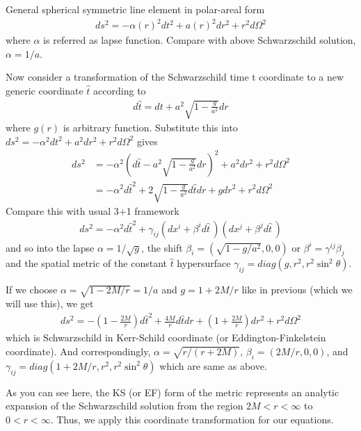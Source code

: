 \documentclass[prd]{revtex4}
\begin{document}
General spherical symmetric line element in polar-areal form
\begin{align}
\label{eqn:ss-met-pa}
ds^2 = - \alpha(r)^2 dt^2 + a(r)^2 dr^2 + r^2 d \Omega^2
\end{align}
where $\alpha$ is referred as lapse function. Compare with above Schwarzschild solution, $\alpha = 1/a$. 

Now consider a transformation of the Schwarzschild time t coordinate to a new generic coordinate $\hat{t}$ according to
\begin{align}
d\hat{t} = dt + a^2 \sqrt{1-\frac{g}{a^2}} dr
\end{align}
where $g(r)$ is arbitrary function. Substitute this into $ds^2 = -\alpha^2 dt^2 + a^2 dr^2 + r^2 d\Omega^2$ gives
\begin{align}
ds^2 &= - \alpha^2 \left (d\hat{t} - a^2 \sqrt{1-\frac{g}{a^2}} dr\right)^2 + a^2 dr^2 + r^2 d\Omega^2 \nonumber \\
&= - \alpha^2 d \hat{t}^2 + 2 \sqrt{1-\frac{g}{a^2}} d\hat{t} dr + g dr^2 + r^2 d \Omega^2
\end{align}
Compare this with usual 3+1 framework
\begin{align}
ds^2 = - \alpha^2 d \hat{t}^2 + \gamma_{ij} (dx^i + \beta^i d\hat{t}\,)(dx^j + \beta^j d\hat{t}\,)
\end{align}
and so into the lapse $\alpha = 1/\sqrt{g}$, the shift $\beta_i = (\sqrt{1-g/a^2},0,0)$ or $\beta^i = \gamma^{ij} \beta_j$ and the spatial metric of the constant $\hat{t}$ hypersurface $\gamma_{ij} = diag(g,r^2,r^2\sin^2 \theta)$. 

If we choose $\alpha = \sqrt{1-2M/r} = 1/a$ and $g = 1+2M/r$ like in previous (which we will use this), we get
\begin{align}
ds^2 = - \left(1 - \frac{2M}{r} \right) d \hat{t}^2 + \frac{4M}{r} d \hat{t} dr + \left(1+\frac{2M}{r} \right) dr^2 + r^2 d\Omega^2
\end{align}
which is Schwarzschild in Kerr-Schild coordinate (or Eddington-Finkelstein coordinate). And correspondingly, $\alpha = \sqrt{r/(r+2M)}$, $\beta_i = (2M/r,0,0)$, and $\gamma_{ij} = diag(1+2M/r,r^2,r^2\sin^2 \theta)$ which are same as above.

As you can see here, the KS (or EF) form of the metric represents an analytic expansion of the Schwarzschild solution from the region $2M < r< \infty$ to  $0<r<\infty$. Thus, we apply this coordinate transformation for our equations.
\end{document}
